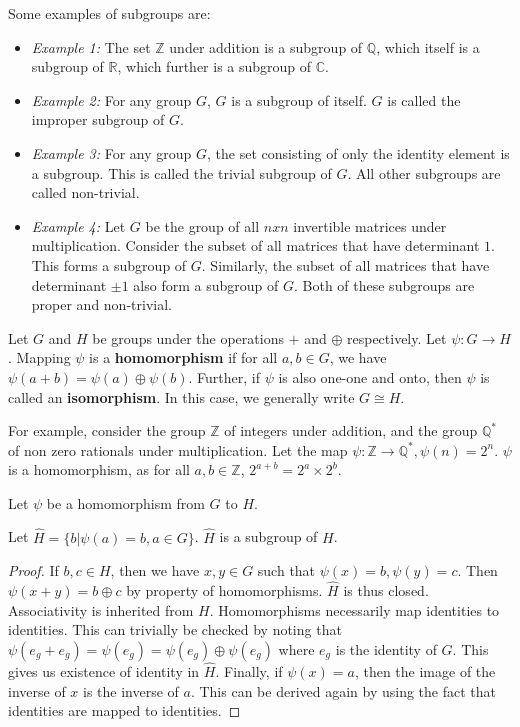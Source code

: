Some examples of subgroups are:
\begin{itemize}
  \item \emph{Example 1:} The set $\mathbb{Z}$ under addition is a subgroup of $\mathbb{Q}$, which itself is a subgroup of $\mathbb{R}$, which further is a subgroup of $\mathbb{C}$.
  \item \emph{Example 2:} For any group $G$, $G$ is a subgroup of itself.
    $G$ is called the improper subgroup of $G$.
  \item \emph{Example 3:} For any group $G$, the set consisting of only the identity element is a subgroup.
    This is called the trivial subgroup of $G$.
    All other subgroups are called non-trivial.
  \item \emph{Example 4:} Let $G$ be the group of all $nxn$ invertible matrices under multiplication.
    Consider the subset of all matrices that have determinant $1$.
    This forms a subgroup of $G$.
    Similarly, the subset of all matrices that have determinant $\pm 1$ also form a subgroup of $G$.
    Both of these subgroups are proper and non-trivial.
\end{itemize}

\begin{definition} \label{def:homomorphism}
  Let $G$ and $H$ be groups under the operations $+$ and $\oplus$ respectively.
  Let $\psi: G \rightarrow H$. Mapping $\psi$ is a \textbf{homomorphism} if for all $a, b \in G$, we have $\psi(a + b) = \psi(a) \oplus \psi(b)$.
  Further, if $\psi$ is also one-one and onto, then $\psi$ is called an \textbf{isomorphism}.
  In this case, we generally write $G \cong H$.
\end{definition}
For example, consider the group $\mathbb{Z}$ of integers under addition, and the group $\mathbb{Q}^{*}$ of non zero rationals under multiplication.
Let the map $\psi: \mathbb{Z} \rightarrow \mathbb{Q}^{*}, \psi(n) = 2^{n}$.
$\psi$ is a homomorphism, as for all $a, b \in \mathbb{Z}$, $2^{a+b} = 2^{a} \times 2^{b}$.
\par
Let $\psi$ be a homomorphism from $G$ to $H$.
\begin{lemma} \label{lem:imagesubgroup}
  Let $\widehat{H} = \{b | \psi(a) = b, a \in G\}$.
  $\widehat{H}$ is a subgroup of $H$.
\end{lemma}
\begin{proof}
  If $b, c \in H$, then we have $x, y \in G$ such that $\psi(x) = b, \psi(y) = c$.
  Then $\psi( x + y) = b \oplus c$ by property of homomorphisms.
  $\widehat{H}$ is thus closed.
  Associativity is inherited from $H$.
  Homomorphisms necessarily map identities to identities.
  This can trivially be checked by noting that $\psi(e_{g} + e_{g}) = \psi(e_{g}) = \psi(e_{g}) \oplus \psi(e_{g})$ where $e_{g}$ is the identity of $G$.
  This gives us existence of identity in $\widehat{H}$.
  Finally, if $\psi(x) = a$, then the image of the inverse of $x$ is the inverse of $a$.
  This can be derived again by using the fact that identities are mapped to identities.
\end{proof}

